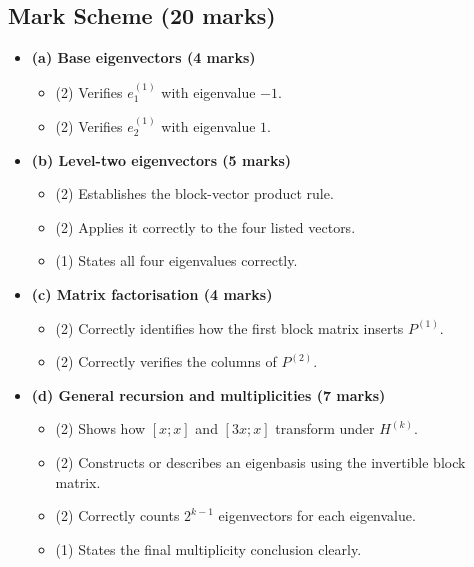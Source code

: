 \documentclass[12pt]{article}
\begin{document}
\subsection{Mark Scheme (20 marks)}
\begin{itemize}[leftmargin=1.6em]
  \item \textbf{(a) Base eigenvectors (4 marks)}
  \begin{itemize}[leftmargin=1.6em]
    \item (2) Verifies $e_1^{(1)}$ with eigenvalue $-1$.
    \item (2) Verifies $e_2^{(1)}$ with eigenvalue $1$.
  \end{itemize}
  \item \textbf{(b) Level-two eigenvectors (5 marks)}
  \begin{itemize}[leftmargin=1.6em]
    \item (2) Establishes the block-vector product rule.
    \item (2) Applies it correctly to the four listed vectors.
    \item (1) States all four eigenvalues correctly.
  \end{itemize}
  \item \textbf{(c) Matrix factorisation (4 marks)}
  \begin{itemize}[leftmargin=1.6em]
    \item (2) Correctly identifies how the first block matrix inserts $P^{(1)}$.
    \item (2) Correctly verifies the columns of $P^{(2)}$.
  \end{itemize}
  \item \textbf{(d) General recursion and multiplicities (7 marks)}
  \begin{itemize}[leftmargin=1.6em]
    \item (2) Shows how $[x;x]$ and $[3x;x]$ transform under $H^{(k)}$.
    \item (2) Constructs or describes an eigenbasis using the invertible block matrix.
    \item (2) Correctly counts $2^{k-1}$ eigenvectors for each eigenvalue.
    \item (1) States the final multiplicity conclusion clearly.
  \end{itemize}
\end{itemize}
\end{document}
